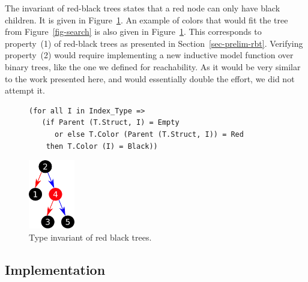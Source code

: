 \documentclass{llncs}
\begin{document}
The invariant of red-black trees states that a red node can only have black
children. It is given in Figure~\ref{fig-rbt}. An example of colors that would
fit the tree from Figure~\ref{fig-search} is also given in
Figure~\ref{fig-rbt}.  This corresponds to property~(1) of red-black trees as
presented in Section~\ref{sec-prelim-rbt}. Verifying property~(2) would require
implementing a new inductive model function over binary trees, like the one we
defined for reachability. As it would be very similar to the work presented
here, and would essentially double the effort, we did not attempt it.


\begin{figure}[ht]
\begin{minipage}[c]{.77\linewidth}
\begin{small}
\begin{lstlisting}
(for all I in Index_Type =>
   (if Parent (T.Struct, I) = Empty
      or else T.Color (Parent (T.Struct, I)) = Red
    then T.Color (I) = Black))
\end{lstlisting}
\end{small}
\end{minipage}\hfill
\begin{minipage}[c]{.22\linewidth}
\begin{center}
\includegraphics[width=2cm]{red_black.pdf}
\end{center}
\end{minipage}
\caption{\label{fig-rbt} Type invariant of red black trees.}
\end{figure}

\subsection{Implementation}
\label{sec-implementation}
\end{document}

